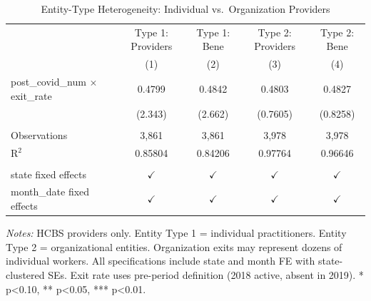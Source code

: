 
\begin{table}[htbp]
   \caption{\label{tab:entity_type} Entity-Type Heterogeneity: Individual vs.\ Organization Providers}
   \bigskip
   \centering
   \begin{tabular}{lcccc}
      \toprule
                                               & Type 1: Providers & Type 1: Bene  & Type 2: Providers & Type 2: Bene \\   
                                               & (1)               & (2)           & (3)               & (4)\\  
      \midrule 
      post\_covid\_num $\times$ exit\_rate     & 0.4799            & 0.4842        & 0.4803            & 0.4827\\   
                                               & (2.343)           & (2.662)       & (0.7605)          & (0.8258)\\   
       \\
      Observations                             & 3,861             & 3,861         & 3,978             & 3,978\\  
      R$^2$                                    & 0.85804           & 0.84206       & 0.97764           & 0.96646\\  
       \\
      state fixed effects                      & $\checkmark$      & $\checkmark$  & $\checkmark$      & $\checkmark$\\   
      month\_date fixed effects                & $\checkmark$      & $\checkmark$  & $\checkmark$      & $\checkmark$\\   
      \bottomrule
   \end{tabular}
   
   \par \raggedright 
   \textit{Notes:} HCBS providers only. Entity Type 1 = individual practitioners. Entity Type 2 = organizational entities. Organization exits may represent dozens of individual workers. All specifications include state and month FE with state-clustered SEs. Exit rate uses pre-period definition (2018 active, absent in 2019). * p<0.10, ** p<0.05, *** p<0.01.
\end{table}


